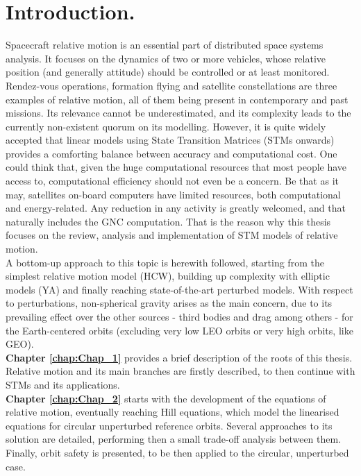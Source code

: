 \chapter{Introduction.}
%
\indent Spacecraft relative motion is an essential part of distributed space systems analysis. It focuses on the dynamics of two or more vehicles, whose relative position (and generally attitude) should be controlled or at least monitored. Rendez-vous operations, formation flying and satellite constellations are three examples of relative motion, all of them being present in contemporary and past missions. Its relevance cannot be underestimated, and its complexity leads to the currently non-existent quorum on its modelling. However, it is quite widely accepted that linear models using State Transition Matrices (\ie STMs onwards) provides a comforting balance between accuracy and computational cost. One could think that, given the huge computational resources that most people have access to, computational efficiency should not even be a concern. Be that as it may, satellites on-board computers have limited resources, both computational and energy-related. Any reduction in any activity is greatly welcomed, and that naturally includes the GNC computation. That is the reason why this thesis focuses on the review, analysis and implementation of STM models of relative motion.\\
%
\indent A bottom-up approach to this topic is herewith followed, starting from the simplest relative motion model (HCW), building up complexity with elliptic models (YA) and finally reaching state-of-the-art perturbed models. With respect to perturbations, non-spherical gravity arises as the main concern, due to its prevailing effect over the other sources - third bodies and drag among others - for the Earth-centered orbits (excluding very low LEO orbits or very high orbits, like GEO).\\
%
\indent \textbf{Chapter \ref{chap:Chap_1}} provides a brief description of the roots of this thesis. Relative motion and its main branches are firstly described, to then continue with STMs and its applications.\\
%
\indent \textbf{Chapter \ref{chap:Chap_2}} starts with the development of the equations of relative motion, eventually reaching Hill equations, which model the linearised equations for circular unperturbed reference orbits. Several approaches to its solution are detailed, performing then a small trade-off analysis between them. Finally, orbit safety is presented, to be then applied to the circular, unperturbed case. \\

